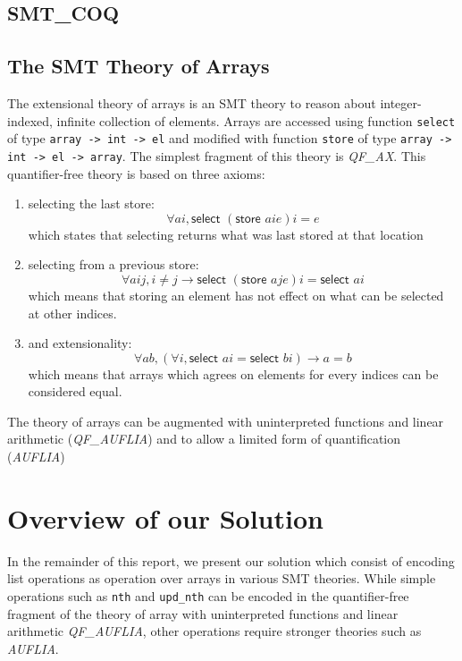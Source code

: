 \documentclass[preprint]{sigplanconf}
\begin{document}
\subsection{SMT\_COQ}

\subsection{The SMT Theory of Arrays}
The extensional theory of arrays is an SMT theory to reason about integer-indexed, infinite collection of elements. Arrays are accessed using function \lstinline|select| of type \lstinline|array -> int -> el| and modified with function \lstinline|store| of type \lstinline|array -> int -> el -> array|. The simplest fragment of this theory is \emph{QF\_AX}. This quantifier-free theory is based on three axioms:
\begin{enumerate}
\item selecting the last store:
  $$ \forall a i, \textsf{select } (\textsf{store } a i e) i = e$$
which states that selecting returns what was last stored at that location
  
\item selecting from a previous store:
  $$ \forall a i j, i \neq j \to \textsf{select } (\textsf{store } a j e) i = \textsf{select } a i$$
  which means that storing an element has not effect on what can be selected at other indices.
  
\item and extensionality:
  $$ \forall a b, (\forall i, \textsf{select } a i = \textsf{select } b i) \to a = b$$
  which means that arrays which agrees on elements for every indices can be considered equal.
\end{enumerate}

The theory of arrays can be augmented with uninterpreted functions and linear arithmetic (\emph{QF\_AUFLIA}) and to allow a limited form of quantification (\emph{AUFLIA})


\section{Overview of our Solution}

In the remainder of this report, we present our solution which consist of encoding list operations as operation over arrays in various SMT theories. While simple operations such as \lstinline|nth| and \lstinline|upd_nth| can be encoded in the quantifier-free fragment of the theory of array with uninterpreted functions and linear arithmetic \emph{QF\_AUFLIA}, other operations require stronger theories such as \emph{AUFLIA}. 
\end{document}
